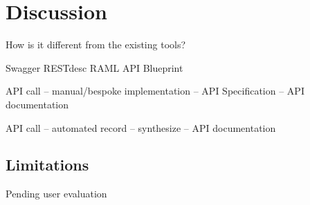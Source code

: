 \documentclass[conference]{IEEEtran}
\begin{document}
\section{Discussion}
How is it different from the existing tools?

Swagger
RESTdesc
RAML
API Blueprint


API call -- manual/bespoke implementation -- API Specification -- API documentation

API call -- automated record -- synthesize --  API documentation


\subsection{Limitations}
Pending user evaluation

%
%



%
%
\end{document}

